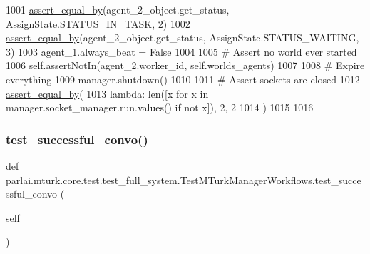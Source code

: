 \begin{DoxyCode}
1001         \hyperlink{namespaceparlai_1_1mturk_1_1core_1_1test_1_1test__full__system_a0b463246d35658a2e422010f13dcf819}{assert\_equal\_by}(agent\_2\_object.get\_status, AssignState.STATUS\_IN\_TASK, 2)
1002         \hyperlink{namespaceparlai_1_1mturk_1_1core_1_1test_1_1test__full__system_a0b463246d35658a2e422010f13dcf819}{assert\_equal\_by}(agent\_2\_object.get\_status, AssignState.STATUS\_WAITING, 3)
1003         agent\_1.always\_beat = \textcolor{keyword}{False}
1004 
1005         \textcolor{comment}{# Assert no world ever started}
1006         self.assertNotIn(agent\_2.worker\_id, self.worlds\_agents)
1007 
1008         \textcolor{comment}{# Expire everything}
1009         manager.shutdown()
1010 
1011         \textcolor{comment}{# Assert sockets are closed}
1012         \hyperlink{namespaceparlai_1_1mturk_1_1core_1_1test_1_1test__full__system_a0b463246d35658a2e422010f13dcf819}{assert\_equal\_by}(
1013             \textcolor{keyword}{lambda}: len([x \textcolor{keywordflow}{for} x \textcolor{keywordflow}{in} manager.socket\_manager.run.values() \textcolor{keywordflow}{if} \textcolor{keywordflow}{not} x]), 2, 2
1014         )
1015 
1016 
\end{DoxyCode}
\mbox{\label{classparlai_1_1mturk_1_1core_1_1test_1_1test__full__system_1_1TestMTurkManagerWorkflows_a57d2c60bcdf0e907cb6c67873d2c4b24}} 
\subsubsection{\texorpdfstring{test\+\_\+successful\+\_\+convo()}{test\_successful\_convo()}}
{\footnotesize\ttfamily def parlai.\+mturk.\+core.\+test.\+test\+\_\+full\+\_\+system.\+Test\+M\+Turk\+Manager\+Workflows.\+test\+\_\+successful\+\_\+convo (\begin{DoxyParamCaption}\item[{}]{self }\end{DoxyParamCaption})}



